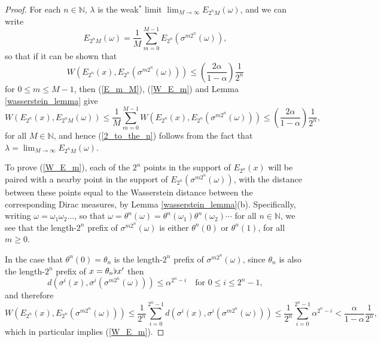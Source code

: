 \documentclass[reqno,11pt]{amsart}
\theoremstyle{definition}
\theoremstyle{remark}
\theoremstyle{remark}
\def \N {\mathbb N}
\def\a{\alpha}
\def\b{\kern 0.02em \flat \kern 0.02em}
\numberwithin{equation}{section}
\begin{document}
\begin{proof}
For each $n\in\N$, 
$\lambda$ is the weak$^*$ limit
$\lim_{M\to\infty} E_{2^nM}(\omega)$, and we can write
\begin{equation}\label{E_m_M}
E_{2^nM}(\omega)
=
\frac{1}{M}\sum_{m=0}^{M-1} E_{2^n}\left(\sigma^{m2^n}(\omega)\right),
\end{equation}
so that if it can be shown that
\begin{equation}\label{W_E_m}
W\left(E_{2^n}(x),  E_{2^n}\left(\sigma^{m2^n}(\omega)\right) \right) \le \left(\frac{2\a}{1-\a}\right) \frac{1}{2^{n}}
\end{equation}
for $0\le m\le M-1$, then (\ref{E_m_M}), (\ref{W_E_m}) and Lemma \ref{wasserstein_lemma} give
$$
W\left(E_{2^{n}}(x),  E_{2^nM}(\omega)\right)\le
\frac{1}{M} \sum_{m=0}^{M-1} W( E_{2^{n}}(x),  E_{2^n}\left(\sigma^{m2^n}(\omega)\right) )
\le \left(\frac{2\a}{1-\a}\right) \frac{1}{2^{n}},
$$
for all $M\in\N$, and hence (\ref{2_to_the_n}) follows from the fact that $\lambda=\lim_{M\to\infty} E_{2^nM}(\omega)$.

To prove (\ref{W_E_m}), each of the $2^n$ points in the support of $E_{2^n}(x)$ 
will be paired with a nearby point in the support of
$E_{2^n}(\sigma^{m2^n}(\omega))$, with the distance between these points 
equal to the Wasserstein distance between the corresponding Dirac measures, by Lemma \ref{wasserstein_lemma}(b).
Specifically, writing $\omega=\omega_1\omega_2\ldots$, so that
	$\omega=\theta^n(\omega)=\theta^n(\omega_1)\theta^n(\omega_2)\cdots$
for all $n\in\N$,
we see that 
 the length-$2^n$ prefix of
$\sigma^{m2^n}(\omega)$
is either $\theta^n(0)$ or $\theta^n(1)$,
for all $m\ge0$.

In the case that $\theta^n(0)=\theta_n$
is the length-$2^n$ prefix of
$\sigma^{m2^n}(\omega)$, since $\theta_n$ is also the length-$2^n$ prefix of $x=\theta_n \b x'$
then 
\begin{equation*}
d(\sigma^i(x),\sigma^i(\sigma^{m2^n}(\omega)))\le \alpha^{2^n-i} \quad\text{for }0\le i\le 2^n-1,
\end{equation*}
and therefore
$$
W\left(E_{2^n}(x),  E_{2^n}\left(\sigma^{m2^n}(\omega)\right) \right) \le
\frac{1}{2^n} \sum_{i=0}^{2^n-1} d(\sigma^i(x),\sigma^i(\sigma^{m2^n}(\omega)))
\le
\frac{1}{2^n} \sum_{i=0}^{2^n-1} \alpha^{2^n-i} < \frac{\alpha}{1-\alpha} \frac{1}{2^n},
$$
which in particular implies (\ref{W_E_m}).


\end{proof}
\end{document}
